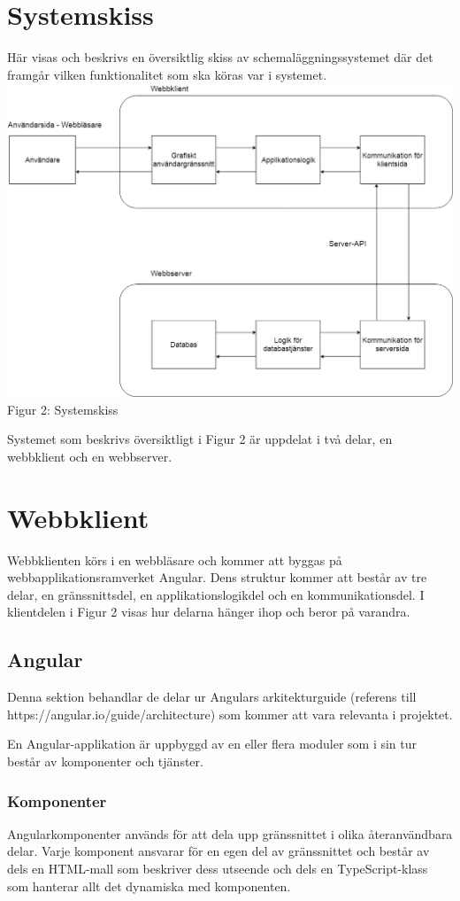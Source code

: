 \documentclass[a4paper,10pt]{article}
\begin{document}
\section{Systemskiss}
\label{sec:Systemskiss}
Här visas och beskrivs en översiktlig skiss av schemaläggningssystemet där det framgår vilken funktionalitet som ska köras var i systemet. \\
\includegraphics[width=\textwidth,height=.7\textheight]{Systemskiss.png}\\
Figur 2: Systemskiss

Systemet som beskrivs översiktligt i Figur 2 är uppdelat i två delar, en webbklient och en webbserver.
\section{Webbklient}
\label{sec:webbklient}
Webbklienten körs i en webbläsare och kommer att byggas på webbapplikationsramverket Angular. Dens struktur kommer att består av tre delar, en gränssnittsdel, en applikationslogikdel och en kommunikationsdel. I klientdelen i Figur 2 visas hur delarna hänger ihop och beror på varandra.

\subsection{Angular}
Denna sektion behandlar de delar ur Angulars arkitekturguide (referens till https://angular.io/guide/architecture) som kommer att vara relevanta i projektet.

En Angular-applikation är uppbyggd av en eller flera moduler som i sin tur består av komponenter och tjänster.
\subsubsection{Komponenter}
\label{sec:komponent}
Angularkomponenter används för att dela upp gränssnittet i olika återanvändbara delar. Varje komponent ansvarar för en egen del av gränssnittet och består av dels en HTML-mall som beskriver dess utseende och dels en TypeScript-klass som hanterar allt det dynamiska med komponenten.
\end{document}
